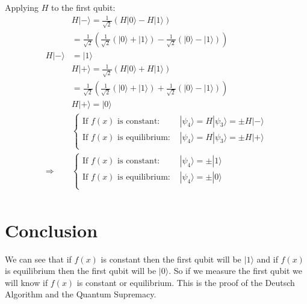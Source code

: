 \documentclass{article}
\begin{document}
Applying $H$ to the first qubit:
\begin{equation}
    \begin{split}
        & H|-\rangle = \frac{1}{\sqrt{2}}(H|0\rangle - H|1\rangle) \\
        & = \frac{1}{\sqrt{2}}(\frac{1}{\sqrt{2}}(|0\rangle + |1\rangle) - \frac{1}{\sqrt{2}}(|0\rangle - |1\rangle)) \\
        H|-\rangle & = |1\rangle \\
        & H|+\rangle = \frac{1}{\sqrt{2}}(H|0\rangle + H|1\rangle) \\
        & = \frac{1}{\sqrt{2}}(\frac{1}{\sqrt{2}}(|0\rangle + |1\rangle) + \frac{1}{\sqrt{2}}(|0\rangle - |1\rangle)) \\
        & H|+\rangle = |0\rangle \\
        & \begin{cases}
            \text{If $f(x)$ is constant: } & |\psi_4\rangle = H|\psi_3\rangle = \pm H|-\rangle \\
            \text{If $f(x)$ is equilibrium: } & |\psi_4\rangle = H|\psi_3\rangle = \pm H|+\rangle \\
        \end{cases} \\
        \Longrightarrow & \begin{cases}
            \text{If $f(x)$ is constant: } & |\psi_4\rangle = \pm|1\rangle \\
            \text{If $f(x)$ is equilibrium: } & |\psi_4\rangle = \pm|0\rangle \\
        \end{cases} \\
    \end{split}
\end{equation}

\section{Conclusion}

We can see that if $f(x)$ is constant then the first qubit will be $|1\rangle$ and if $f(x)$ is equilibrium
then the first qubit will be $|0\rangle$. So if we measure the first qubit we will know if $f(x)$ is constant
or equilibrium. This is the proof of the Deutsch Algorithm and the Quantum Supremacy.
\end{document}
